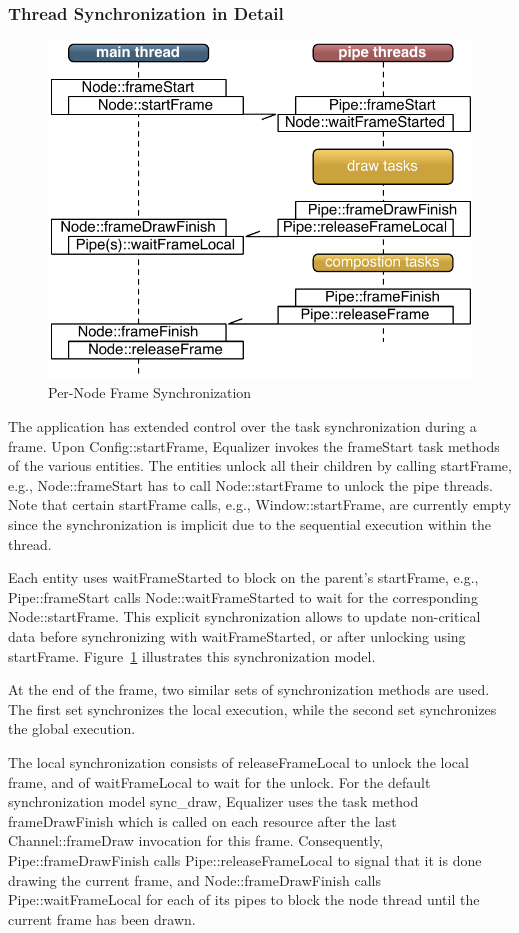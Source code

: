 \documentclass[10pt,a4]{scrartcl}
\newcommand{\fig}[1]{Figure~\ref{#1}}
\begin{document}
\subsubsection{Thread Synchronization in Detail}

\begin{figure}
  \includegraphics[width=.618\textwidth]{images/frameSync.pdf}
  {\caption{\label{fFrameSync}Per-Node Frame Synchronization}}
\end{figure}
The application has extended control over the task synchronization
during a frame. Upon \textsf{Config::startFrame}, Equalizer invokes the
\textsf{frameStart} task methods of the various entities. The entities
unlock all their children by calling \textsf{startFrame}, e.g.,
\textsf{Node::frameStart} has to call \textsf{Node::startFrame}
to unlock the pipe threads. Note that certain \textsf{startFrame} calls,
e.g., \textsf{Window::startFrame}, are currently empty since the
synchronization is implicit due to the sequential execution within the
thread.

Each entity uses \textsf{waitFrame\-Started} to block on the parent's
\textsf{startFrame}, e.g., \textsf{Pipe::\-frame\-Start} calls
\textsf{Node::wait\-Frame\-Started} to wait for the corresponding
\textsf{Node::start\-Fra\-me}. This explicit synchronization allows to
update non-critical data before synchronizing with
\textsf{waitFrameStarted}, or after unlocking using
\textsf{start\-Fra\-me}. \fig{fFrameSync} illustrates this
synchronization model.

At the end of the frame, two similar sets of synchronization methods are
used. The first set synchronizes the local execution, while the second
set synchronizes the global execution.

The local synchronization consists of \textsf{releaseFrameLocal} to
unlock the local frame, and of \textsf{waitFrameLocal} to wait for the
unlock. For the default synchronization model \textsf{sync\_draw},
Equalizer uses the task method \textsf{frameDrawFinish} which is called
on each resource after the last \textsf{Channel::frameDraw} invocation
for this frame. Consequently, \textsf{Pipe::frameDraw\-Fi\-nish} calls
\textsf{Pipe::\-release\-Frame\-Lo\-cal} to signal that it is done
drawing the current frame, and \textsf{Node::frameDrawFinish} calls
\textsf{Pipe::waitFrameLocal} for each of its pipes to block the node
thread until the current frame has been drawn.
\end{document}
